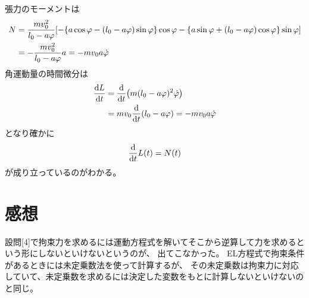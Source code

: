 \documentclass[../ap_2012.tex]{subfiles}
\begin{document}
\section{}
張力のモーメントは
\begin{equation}\begin{aligned}[b]
    N &= \frac{mv_0^2}{l_0-a\varphi}\qty[
        -\qty{a\cos\varphi-(l_0-a\varphi)\sin\varphi}\cos\varphi
        -\qty{a\sin\varphi+(l_0-a\varphi)\cos\varphi}\sin\varphi]\\
    &=-\frac{mv_0^2}{l_0-a\varphi}a = -mv_0 a\dot{\varphi}
\end{aligned}\end{equation}
角運動量の時間微分は
\begin{equation}\begin{aligned}[b]
    \dv{L}{t} &= \dv{t}\qty(m(l_0-a\varphi)^2\dot{\varphi})\\
    &=mv_0\dv{t}\qty(l_0-a\varphi) = -mv_0 a\dot{\varphi}
\end{aligned}\end{equation}
となり確かに
\begin{equation}\begin{aligned}[b]
    \dv{t}L(t)=N(t)
\end{aligned}\end{equation}
が成り立っているのがわかる。

\section*{感想}
設問[4]で拘束力を求めるには運動方程式を解いてそこから逆算して力を求めるという形にしないといけないというのが、
出てこなかった。
EL方程式で拘束条件があるときには未定乗数法を使って計算するが、
その未定乗数は拘束力に対応していて、未定乗数を求めるには決定した変数をもとに計算しないといけないのと同じ。
\end{document}

